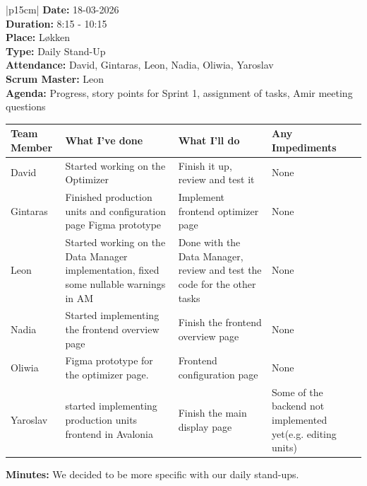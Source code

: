 \begin{table}[H]
    \centering
    \begin{tabular}{|p{15cm}|}   
        \hline
        \textbf{Date:}  18-03-2026 \\
        \textbf{Duration:} 8:15 - 10:15 \\
        \textbf{Place:}  Løkken \\
        \textbf{Type:}  Daily Stand-Up \\
        \textbf{Attendance:} David, Gintaras, Leon, Nadia, Oliwia, Yaroslav \\
        \textbf{Scrum Master:}  Leon \\
        \textbf{Agenda:} Progress, story points for Sprint 1, assignment of tasks, Amir meeting questions
        \begin{table}[H]
            \begin{tabular}{|p{1.75cm}|p{4cm}|p{4cm}|p{4cm}|}
                \hline
                \cellcolor[HTML]{BFBFBF}  \textbf{Team Member} & \cellcolor[HTML]{BFBFBF}  \textbf{What I've done} & \cellcolor[HTML]{BFBFBF}  \textbf{What I'll do} & \cellcolor[HTML]{BFBFBF}  \textbf{Any Impediments}\\
                \hline
                \cellcolor[HTML]{d4d4d4} David & Started working on the Optimizer & Finish it up, review and test it & None \\
                \hline
                \cellcolor[HTML]{d4d4d4} Gintaras & Finished production units and configuration page Figma prototype & Implement frontend optimizer page & None \\
                \hline
                \cellcolor[HTML]{d4d4d4} Leon & Started working on the Data Manager implementation, fixed some nullable warnings in AM  & Done with the Data Manager, review and test the code for the other tasks & None \\
                \hline
                \cellcolor[HTML]{d4d4d4} Nadia & Started implementing the frontend overview page & Finish the frontend overview page & None \\
                \hline
                \cellcolor[HTML]{d4d4d4} Oliwia & Figma prototype for the optimizer page. & Frontend configuration page & None \\
                \hline
                \cellcolor[HTML]{d4d4d4} Yaroslav & started implementing production units frontend in Avalonia & Finish the main display page & Some of the backend not implemented yet(e.g. editing units) \\
                \hline
            \end{tabular}
        \end{table}
        \textbf{Minutes:} We decided to be more specific with our daily stand-ups. \\
        \hline
    \end{tabular}
\end{table}

